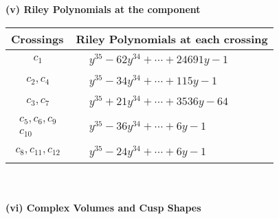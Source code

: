 \documentclass[1p]{elsarticle_modified}
\theoremstyle{definition}
\begin{document}
\newpage\renewcommand{\arraystretch}{1}
\flushleft \textbf{(v) Riley Polynomials at the component}\newline \\
\begin{tabular}{m{50pt}|m{274pt}}
Crossings & \hspace{64pt}Riley Polynomials at each crossing \\
\hline $$\begin{aligned}c_{1}\end{aligned}$$&$\begin{aligned}
&y^{35}-62 y^{34}+\cdots+24691 y-1
\end{aligned}$\\
\hline $$\begin{aligned}c_{2},c_{4}\end{aligned}$$&$\begin{aligned}
&y^{35}-34 y^{34}+\cdots+115 y-1
\end{aligned}$\\
\hline $$\begin{aligned}c_{3},c_{7}\end{aligned}$$&$\begin{aligned}
&y^{35}+21 y^{34}+\cdots+3536 y-64
\end{aligned}$\\
\hline $$\begin{aligned}c_{5},c_{6},c_{9}\\c_{10}\end{aligned}$$&$\begin{aligned}
&y^{35}-36 y^{34}+\cdots+6 y-1
\end{aligned}$\\
\hline $$\begin{aligned}c_{8},c_{11},c_{12}\end{aligned}$$&$\begin{aligned}
&y^{35}-24 y^{34}+\cdots+6 y-1
\end{aligned}$\\
\hline
\end{tabular}\\~\\
\newpage\flushleft \textbf{(vi) Complex Volumes and Cusp Shapes}
\end{document}
